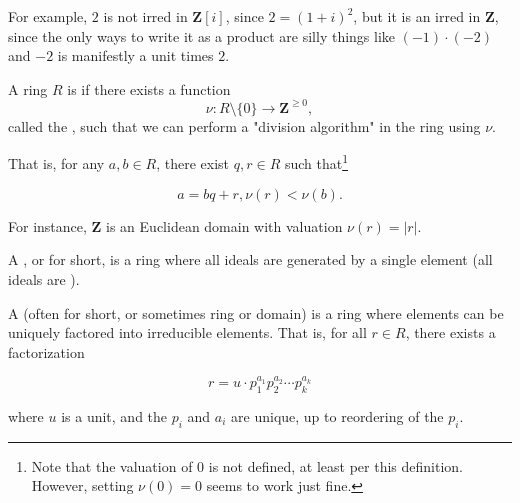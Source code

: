 

For example, \(2\) is not irred in \({\mathbf Z}[i]\), since \(2={(1+i)}^2\),
but it is an irred in \({\mathbf Z}\), since the only ways to write it as a
product are silly things like \((-1)\cdot (-2)\) and \(-2\) is manifestly a unit
times \(2\).

\begin{definition}
  A ring \(R\) is  if there exists a function \[\nu :
    R\setminus\{0\}\to{\mathbf Z} ^ {\geq 0},\] called the , such that we can perform a "division algorithm" in the ring
  using \(\nu\).
\end{definition}
That is, for any \(a, b\in R\), there exist \(q, r\in R\) such
that\footnote{Note that the valuation of \(0\) is not defined, at least per this
  definition. However, setting \(\nu(0)=0\) seems to work just fine.}


\[a=bq+r, \nu(r) < \nu(b).\]

For instance, \({\mathbf Z}\) is an Euclidean domain with valuation \(\nu(r) =
|r|\).

\begin{definition}
  A , or  for short, is a ring
  where all ideals are generated by a single element (all ideals are
  ).
\end{definition}

\begin{definition}
  A  (often  for short, or
  sometimes  ring or domain) is a ring where elements can be
  uniquely factored into irreducible elements. That is, for all \(r\in R\),
  there exists a factorization

  \[ r=u\cdot p_1 ^ {a_1}p_2 ^ {a_2}\cdots p_k ^ {a_k} \]

  where \(u\) is a unit, and the \(p_i\) and \(a_i\) are unique, up to
  reordering of the \(p_i\).
\end{definition}

